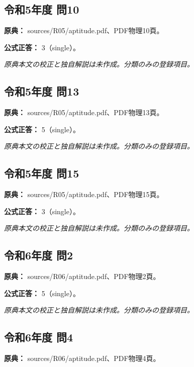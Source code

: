 \subsection{令和5年度 問10}
\label{q:r05-reg-apt-10}

\noindent\textbf{原典：} sources/R05/aptitude.pdf、PDF物理10頁。

\textbf{公式正答：} 3（single）。

\par\textit{原典本文の校正と独自解説は未作成。分類のみの登録項目。}

\subsection{令和5年度 問13}
\label{q:r05-reg-apt-13}

\noindent\textbf{原典：} sources/R05/aptitude.pdf、PDF物理13頁。

\textbf{公式正答：} 5（single）。

\par\textit{原典本文の校正と独自解説は未作成。分類のみの登録項目。}

\subsection{令和5年度 問15}
\label{q:r05-reg-apt-15}

\noindent\textbf{原典：} sources/R05/aptitude.pdf、PDF物理15頁。

\textbf{公式正答：} 3（single）。

\par\textit{原典本文の校正と独自解説は未作成。分類のみの登録項目。}

\subsection{令和6年度 問2}
\label{q:r06-reg-apt-02}

\noindent\textbf{原典：} sources/R06/aptitude.pdf、PDF物理2頁。

\textbf{公式正答：} 5（single）。

\par\textit{原典本文の校正と独自解説は未作成。分類のみの登録項目。}

\subsection{令和6年度 問4}
\label{q:r06-reg-apt-04}

\noindent\textbf{原典：} sources/R06/aptitude.pdf、PDF物理4頁。

